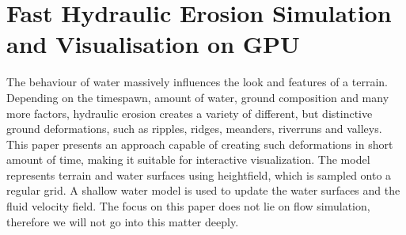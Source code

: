 \section{Fast Hydraulic Erosion Simulation and Visualisation on GPU}
The behaviour of water massively influences the look and features of a terrain. Depending on the timespawn, amount of water, ground composition and many more factors, hydraulic erosion creates a variety of different, but distinctive ground deformations, such as ripples, ridges, meanders, riverruns and valleys. 
This paper presents an approach capable of creating such deformations in short amount of time, making it suitable for interactive visualization. The model represents terrain and water surfaces using heightfield, which is sampled onto a regular grid. A shallow water model is used to update the water surfaces and the fluid velocity field. The focus on this paper does not lie on flow simulation, therefore we will not go into this matter deeply. 